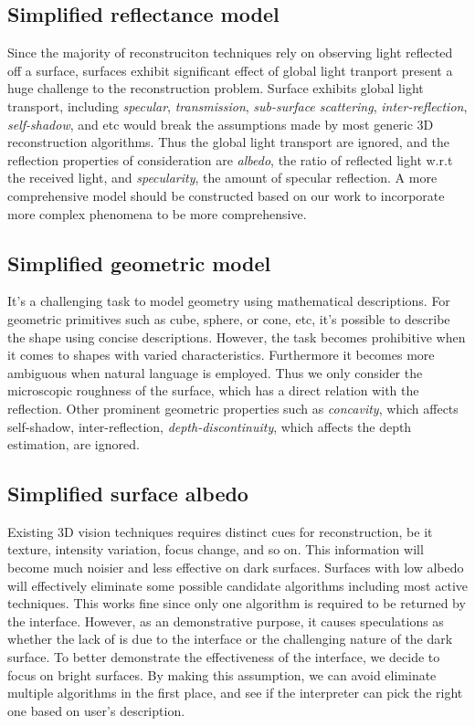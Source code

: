 \subsection{Simplified reflectance model}
Since the majority of reconstruciton techniques rely on observing light reflected off a surface, surfaces exhibit significant effect of global light tranport present a huge challenge to the reconstruction problem. Surface exhibits global light transport, including \textit{specular}, \textit{transmission}, \textit{sub-surface scattering}, \textit{inter-reflection}, \textit{self-shadow}, and etc would break the assumptions made by most generic 3D reconstruction algorithms. Thus the global light transport are ignored, and the reflection properties of consideration are \textit{albedo}, \ie the ratio of reflected light w.r.t the received light, and \textit{specularity}, \ie the amount of specular reflection. A more comprehensive model should be constructed based on our work to incorporate more complex phenomena to be more comprehensive.

\subsection{Simplified geometric model}
It's a challenging task to model geometry using mathematical descriptions. For geometric primitives such as cube, sphere, or cone, etc, it's possible to describe the shape using concise descriptions. However, the task becomes prohibitive when it comes to shapes with varied characteristics. Furthermore it becomes more ambiguous when natural language is employed. Thus we only consider the microscopic roughness of the surface, which has a direct relation with the reflection. Other prominent geometric properties such as \textit{concavity}, which affects self-shadow, inter-reflection, \textit{depth-discontinuity}, which affects the depth estimation, are ignored.

\subsection{Simplified surface albedo}
Existing 3D vision techniques requires distinct cues for reconstruction, be it texture, intensity variation, focus change, and so on. This information will become much noisier and less effective on dark surfaces. Surfaces with low albedo will effectively eliminate some possible candidate algorithms including most active techniques. This works fine since only one algorithm is required to be returned by the interface. However, as an demonstrative purpose, it causes speculations as whether the lack of is due to the interface or the challenging nature of the dark surface. To better demonstrate the effectiveness of the interface, we decide to focus on bright surfaces. By making this assumption, we can avoid eliminate multiple algorithms in the first place, and see if the interpreter can pick the right one based on user's description.

